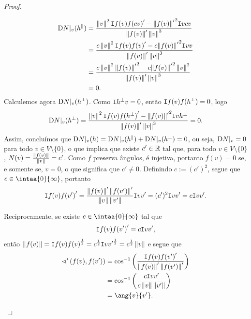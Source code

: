 \begin{proof}
\begin{enumerate}
\begin{align*}
	\mathrm{D} N|_v (h^\parallel) &= \frac{\left\Vert{v}\right\Vert^2\mathtt I{f(v)}{f(cv)}' - {\left\Vert{f(v)}\right\Vert'}^2\mathtt I{v}{cv}}{\left\Vert{f(v)}\right\Vert'\left\Vert{v}\right\Vert^3} \\
		&= \frac{c\left\Vert{v}\right\Vert^2\mathtt I{f(v)}{f(v)}' - c{\left\Vert{f(v)}\right\Vert'}^2\mathtt I{v}{v}}{\left\Vert{f(v)}\right\Vert'\left\Vert{v}\right\Vert^3} \\
		&= \frac{c\left\Vert{v}\right\Vert^2{\left\Vert{f(v)}\right\Vert'}^2 - c{\left\Vert{f(v)}\right\Vert'}^2\left\Vert{v}\right\Vert^2}{\left\Vert{f(v)}\right\Vert'\left\Vert{v}\right\Vert^3} \\
		&= 0.
	\end{align*}	
Calculemos agora $\mathrm{D} N|_v (h^\perp)$. Como $\mathtt I{h^\perp}{v} = 0$, então $\mathtt I{f(v)}{f(h^\perp)} = 0$, logo
	\begin{equation*}
	\mathrm{D} N|_v (h^\perp) = \frac{\left\Vert{v}\right\Vert^2\mathtt I{f(v)}{f(h^\perp)}' - {\left\Vert{f(v)}\right\Vert'}^2\mathtt I{v}{h^\perp}}{\left\Vert{f(v)}\right\Vert'\left\Vert{v}\right\Vert^3} = 0.
	\end{equation*}
Assim, concluímos que $\mathrm{D} N|_v (h) = \mathrm{D} N|_v (h^\parallel) + \mathrm{D} N|_v (h^\perp) = 0$, ou seja, $\mathrm{D} N|_v = 0$ para todo $v \in V \setminus \{0\}$, o que implica que existe $c' \in \mathbb{R}$ tal que, para todo $v \in V \setminus \{0\}$, $N(v) = \frac{\left\Vert{f(v)}\right\Vert}{\left\Vert{v}\right\Vert} = c'$. Como $f$ preserva ângulos, é injetiva, portanto $f(v)=0$ se, e somente se, $v=0$, o que significa que $c' \neq 0$. Definindo $c := (c')^2$, segue que $c \in \intaa{0}{\infty}$, portanto
	\begin{equation*}
	\mathtt I{f(v)}{f(v')}' = \frac{\left\Vert{f(v)}\right\Vert'\left\Vert{f(v')}\right\Vert'}{\left\Vert{v}\right\Vert\left\Vert{v'}\right\Vert}\mathtt I{v}{v'} = (c')^2\mathtt I{v}{v'} = c\mathtt I{v}{v'}.
	\end{equation*}
	
Reciprocamente, se existe $c \in \intaa{0}{\infty}$ tal que
	\begin{equation*}
	\mathtt I{f(v)}{f(v')}' = c\mathtt I{v}{v'},
	\end{equation*}
então $\left\Vert{f(v)}\right\Vert = \mathtt I{f(v)}{f(v)}^{\frac{1}{2}} = c^{\frac{1}{2}}\mathtt I{v}{v'}^{\frac{1}{2}} = c^{\frac{1}{2}}\left\Vert{v}\right\Vert$ e segue que
	\begin{align*}
	\sphericalangle' \left( f(v),f(v') \right) &= \cos\inv \left( \frac{\inte{f(v)}{f(v')}'}{\nor{f(v)}'\nor{f(v')}'} \right) \\
		&= \cos\inv \left( \frac{c\inte{v}{v'}}{c\nor{v}\nor{v'}} \right) \\
		&= \ang{v}{v'}. \qedhere
	\end{align*}
	\end{enumerate}
\end{proof}


































